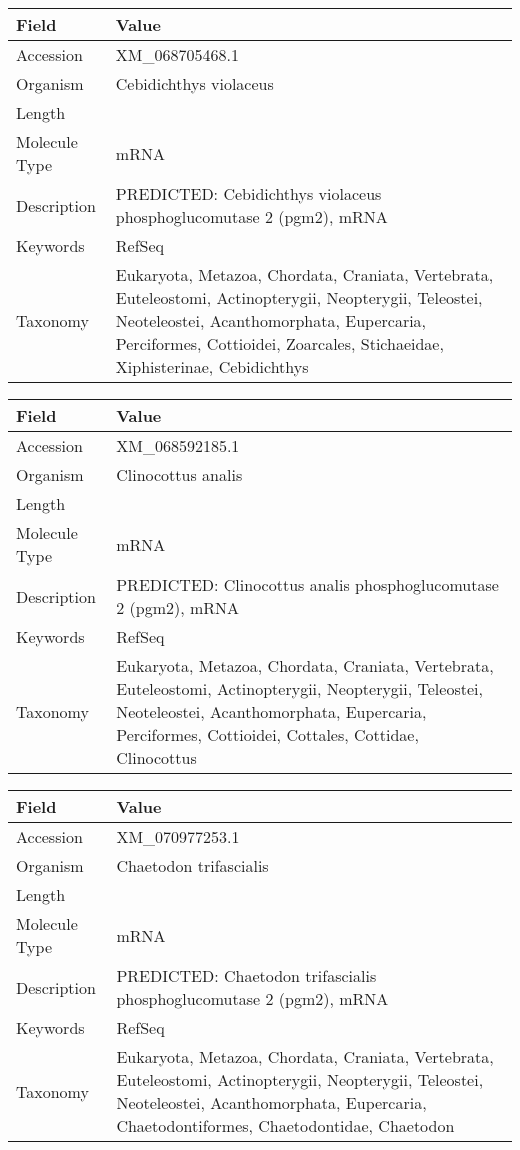 \documentclass[10pt]{article}
\begin{document}
{\footnotesize
\begin{longtable}{>{\raggedright\arraybackslash}p{4.5cm} >{\raggedright\arraybackslash}p{11.5cm}}
\textbf{Field} & \textbf{Value} \\
\hline
Accession & XM\_068705468.1 \\
Organism & Cebidichthys violaceus \\
Length & 2487 \\
Molecule Type & mRNA \\
Description & PREDICTED: Cebidichthys violaceus phosphoglucomutase 2 (pgm2), mRNA \\
Keywords & RefSeq \\
Taxonomy & Eukaryota, Metazoa, Chordata, Craniata, Vertebrata, Euteleostomi, Actinopterygii, Neopterygii, Teleostei, Neoteleostei, Acanthomorphata, Eupercaria, Perciformes, Cottioidei, Zoarcales, Stichaeidae, Xiphisterinae, Cebidichthys \\
\end{longtable}
}

{\footnotesize
\begin{longtable}{>{\raggedright\arraybackslash}p{4.5cm} >{\raggedright\arraybackslash}p{11.5cm}}
\textbf{Field} & \textbf{Value} \\
\hline
Accession & XM\_068592185.1 \\
Organism & Clinocottus analis \\
Length & 2173 \\
Molecule Type & mRNA \\
Description & PREDICTED: Clinocottus analis phosphoglucomutase 2 (pgm2), mRNA \\
Keywords & RefSeq \\
Taxonomy & Eukaryota, Metazoa, Chordata, Craniata, Vertebrata, Euteleostomi, Actinopterygii, Neopterygii, Teleostei, Neoteleostei, Acanthomorphata, Eupercaria, Perciformes, Cottioidei, Cottales, Cottidae, Clinocottus \\
\end{longtable}
}

{\footnotesize
\begin{longtable}{>{\raggedright\arraybackslash}p{4.5cm} >{\raggedright\arraybackslash}p{11.5cm}}
\textbf{Field} & \textbf{Value} \\
\hline
Accession & XM\_070977253.1 \\
Organism & Chaetodon trifascialis \\
Length & 4091 \\
Molecule Type & mRNA \\
Description & PREDICTED: Chaetodon trifascialis phosphoglucomutase 2 (pgm2), mRNA \\
Keywords & RefSeq \\
Taxonomy & Eukaryota, Metazoa, Chordata, Craniata, Vertebrata, Euteleostomi, Actinopterygii, Neopterygii, Teleostei, Neoteleostei, Acanthomorphata, Eupercaria, Chaetodontiformes, Chaetodontidae, Chaetodon \\
\end{longtable}
}
\end{document}
